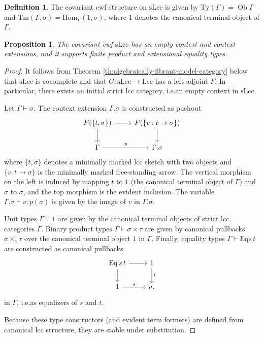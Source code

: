 \documentclass[a4paper]{article}
\newtheorem{proposition}[theorem]{Proposition}
\theoremstyle{remark}
\theoremstyle{definition}
\newtheorem{definition}[theorem]{Definition}
\begin{document}
\begin{definition}
  The covariant cwf structure on $\mathrm{sLcc}$ is given by $\mathrm{Ty}(\Gamma) = \operatorname{Ob} \Gamma$ and $\mathrm{Tm}(\Gamma, \sigma) = \mathrm{Hom}_\Gamma(1, \sigma)$, where $1$ denotes the canonical terminal object of $\Gamma$.
\end{definition}

\begin{proposition}
  \label{prop:slcc-model}
  The covariant cwf $\mathrm{sLcc}$ has an empty context and context extensions, and it supports finite product and extensional equality types.
\end{proposition}
\begin{proof}
  It follows from Theorem \ref{th:algebraically-fibrant-model-category} below that $\mathrm{sLcc}$ is cocomplete and that $G : \mathrm{sLcc} \rightarrow \mathrm{Lcc}$ has a left adjoint $F$.
  In particular, there exists an initial strict lcc category, i.e.\@ an empty context in $\mathrm{sLcc}$.
  
  Let $\Gamma \vdash \sigma$.
  The context extension $\Gamma.\sigma$ is constructed as pushout
  \begin{equation}
    \label{eq:slcc-context-extension}
    \begin{tikzcd}
      F(\{ t, \sigma \}) \arrow[d] \arrow[r] & F(\{ v : t \rightarrow \sigma \}) \arrow[d] \\
      \Gamma \arrow[r, "p"] & \Gamma.\sigma
    \end{tikzcd}
  \end{equation}
  where $\{ t, \sigma \}$ denotes a minimally marked lcc sketch with two objects and $\{ v : t \rightarrow \sigma \}$ is the minimally marked free-standing arrow.
  The vertical morphism on the left is induced by mapping $t$ to $1$ (the canonical terminal object of $\Gamma$) and $\sigma$ to $\sigma$, and the top morphism is the evident inclusion.
  The variable $\Gamma.\sigma \vdash v : p(\sigma)$ is given by the image of $v$ in $\Gamma.\sigma$.

  Unit types $\Gamma \vdash 1$ are given by the canonical terminal objects of strict lcc categories $\Gamma$.
  Binary product types $\Gamma \vdash \sigma \times \tau$ are given by canonical pullbacks $\sigma \times_1 \tau$ over the canonical terminal object $1$ in $\Gamma$.
  Finally, equality types $\Gamma \vdash \mathrm{Eq} s \, t$ are constructed as canonical pullbacks
  \begin{equation}
    \begin{tikzcd}
      \operatorname{\mathrm{Eq}} s \, t \arrow[r] \arrow[d] & 1 \arrow[d, "t"] \\
      1 \arrow[r, "s"] & \sigma,
    \end{tikzcd}
  \end{equation}
  in $\Gamma$, i.e.\@ as equalizers of $s$ and $t$.

  Because these type constructors (and evident term formers) are defined from canonical lcc structure, they are stable under substitution.
\end{proof}
\end{document}

